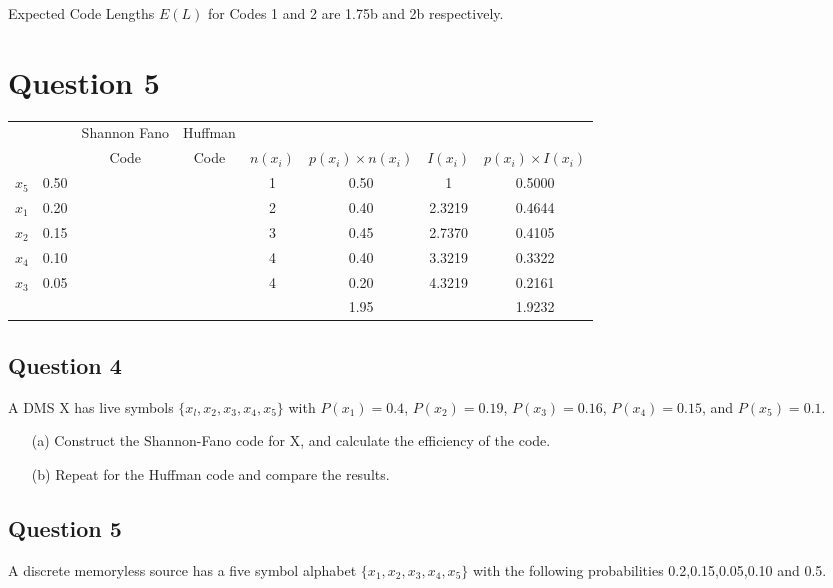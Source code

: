 Expected Code Lengths $E(L)$ for Codes 1 and 2 are 1.75b and 2b respectively.

\section*{Question 5}
\begin{center}
\begin{tabular}{|c|c|c|c|c|c|c|c|}
\hline	&		&	Shannon Fano	&	Huffman	&		&		&		&	\\	
	&		&	 Code	&	Code	&	$n(x_i)$	&	$p(x_i) \times n(x_i)$	&	$I(x_i)$	&	$p(x_i) \times I(x_i)$	\\ \hline
$x_5$	&	0.50	&		&		&	1	&	0.50	&	1	&	0.5000	\\ \hline
$x_1$	&	0.20	&		&		&	2	&	0.40	&	2.3219	&	0.4644	\\ \hline
$x_2$	&	0.15	&		&		&	3	&	0.45	&	2.7370	&	0.4105	\\ \hline
$x_4$	&	0.10	&		&		&	4	&	0.40	&	3.3219	&	0.3322	\\ \hline
$x_3$	&	0.05	&		&		&	4	&	0.20	&	4.3219	&	0.2161	\\ \hline
	&		&		&		&		&	1.95	&		&	1.9232	\\ \hline
 
\end{tabular} 
\end{center}

\newpage 
\subsection*{Question 4}
A DMS X has live symbols $\{x_l,x_2,x_3,x_4,x_5\}$ with $P(x_1) = 0.4$, $P(x_2)=0.19$, $P(x_3) =0.16$,
$P(x_4) = 0.15$, and $P(x_5) = 0.1$.
\begin{itemize}
\item[(a)] Construct the Shannon-Fano code for X, and calculate the efficiency of the code.
\item[(b)] Repeat for the Huffman code and compare the results.
\end{itemize}

\subsection*{Question 5}

A discrete memoryless source has a five symbol alphabet $\{x_1,x_2,x_3,x_4,x_5\}$ with the following probabilities 0.2,0.15,0.05,0.10 and 0.5.

